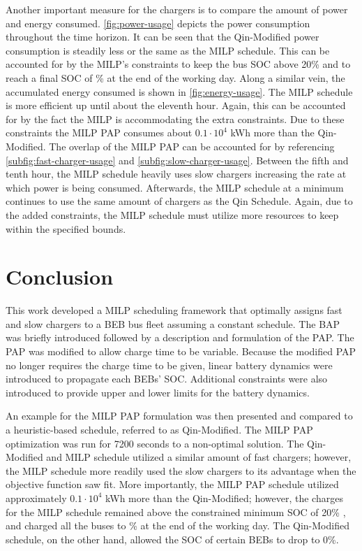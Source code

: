 \documentclass[utf8]{FrontiersinHarvard}
\newcommand{\bcharge}{0.7 }                                                     %
\newcommand{\mincharge}{20\% }                                                  %
\newcommand{\timeran}{7200 }                                                    %
\begin{document}
Another important measure for the chargers is to compare the amount of power and energy consumed.
\autoref{fig:power-usage} depicts the power consumption throughout the time horizon. It can be seen that the
Qin-Modified power consumption is steadily less or the same as the MILP schedule. This can be accounted for by the
MILP's constraints to keep the bus SOC above \mincharge and to reach a final SOC of \fpeval{\bcharge *100}\% at the end
of the working day. Along a similar vein, the accumulated energy consumed is shown in \autoref{fig:energy-usage}. The
MILP schedule is more efficient up until about the eleventh hour. Again, this can be accounted for by the fact the MILP
is accommodating the extra constraints. Due to these constraints the MILP PAP consumes about \(0.1\cdot10^4\) kWh more than
the Qin-Modified. The overlap of the MILP PAP can be accounted for by referencing \autoref{subfig:fast-charger-usage}
and \autoref{subfig:slow-charger-usage}. Between the fifth and tenth hour, the MILP schedule heavily uses slow chargers
increasing the rate at which power is being consumed. Afterwards, the MILP schedule at a minimum continues to use the
same amount of chargers as the Qin Schedule. Again, due to the added constraints, the MILP schedule must utilize more
resources to keep within the specified bounds.
\section{Conclusion}
\label{sec:conclusion}
This work developed a MILP scheduling framework that optimally assigns fast and slow chargers to a BEB bus fleet
assuming a constant schedule. The BAP was briefly introduced followed by a description and formulation of the PAP. The
PAP was modified to allow charge time to be variable. Because the modified PAP no longer requires the charge time to be
given, linear battery dynamics were introduced to propagate each BEBs' SOC. Additional constraints were also introduced
to provide upper and lower limits for the battery dynamics.

An example for the MILP PAP formulation was then presented and compared to a heuristic-based schedule, referred to as
Qin-Modified. The MILP PAP optimization was run for \timeran seconds to a non-optimal solution. The Qin-Modified and
MILP schedule utilized a similar amount of fast chargers; however, the MILP schedule more readily used the slow chargers
to its advantage when the objective function saw fit. More importantly, the MILP PAP schedule utilized approximately
\(0.1\cdot10^4\) kWh more than the Qin-Modified; however, the charges for the MILP schedule remained above the constrained
minimum SOC of \mincharge, and charged all the buses to \fpeval{\bcharge *100}\% at the end of the working day. The
Qin-Modified schedule, on the other hand, allowed the SOC of certain BEBs to drop to 0\%.
\end{document}
